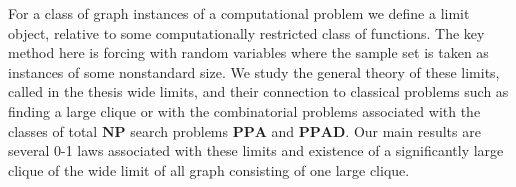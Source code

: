 \documentclass[12pt]{report}
\begin{document}

For a class of graph instances of a computational problem we define a limit object, relative to some computationally restricted class of functions. The key method here is forcing with random variables where the sample set is taken as instances of some nonstandard size. We study the general theory of these limits, called in the thesis wide limits, and their connection to classical problems such as finding a large clique or with the combinatorial problems associated with the classes of total $\textbf{NP}$ search problems $\textbf{PPA}$ and $\textbf{PPAD}$. Our main results are several 0-1 laws associated with these limits and existence of a significantly large clique of the wide limit of all graph consisting of one large clique.
\end{document}
